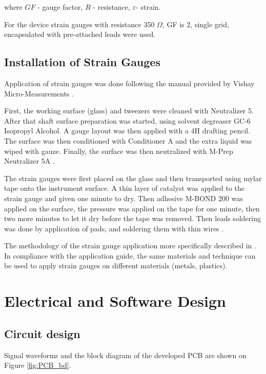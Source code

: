 where $GF$ - gauge factor, $R$ - resistance, $\varepsilon$- strain.

For the device strain gauges with resistance 350 $\Omega$, GF is 2, single grid, encapsulated with pre-attached leads were used.	


	\subsection{Installation of Strain Gauges}
	\label{sec:instSG}

	Application of strain gauges was done following the manual provided by Vishay Micro-Measurements \cite{StrGugeInst}.

    First, the working surface (glass) and tweezers were cleaned with Neutralizer 5. 
    After that shaft surface preparation was started, using solvent degreaser GC-6 Isopropyl Alcohol. 
    A gauge layout was then applied with a 4H drafting pencil. The surface was then conditioned with Conditioner A and the extra liquid was wiped with gauze. 
    Finally, the surface was then neutralized with M-Prep Neutralizer 5A \cite{StrGugeInst}.

    The strain gauges were first placed on the glass and then transported using mylar tape onto the instrument surface. A thin layer of catalyst was applied to the strain gauge and given one minute to dry. Then adhesive M-BOND 200 was applied on the surface, the pressure was applied on the tape for one minute, then two more minutes to let it dry before the tape was removed. Then leads soldering was done by application of pads, and soldering them with thin wires \cite{youtube}.

    The methodology of the strain gauge application more specifically described in \cite{StrGugeInst}. In compliance with the application guide, the same materials and technique can be used to apply strain gauges on different materials (metals, plastics).

\section{Electrical and Software Design}
\label{sec:elecDes}

	\subsection{Circuit design}
	\label{sec:cirDes}
	Signal waveforms and the block diagram of the developed PCB are shown on Figure \ref{fig:PCB_bd}.

